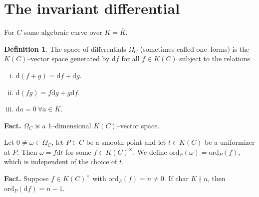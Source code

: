 \documentclass{article}
\theoremstyle{definition}
\newtheorem{defn}{Definition}[section]
\begin{document}
\section{The invariant differential}
For $C$ some algebraic curve over $K=\overline{K}$.
\begin{defn}
    The space of differentials $\Omega_C$ (sometimes called one--forms) is the $K(C)$--vector space generated by $\mathrm{d}f$ for all $f \in K(C)$ subject to the relations
    \begin{enumerate}[(i)]
        \item $\mathrm{d}(f+g)=\mathrm{d}f+\mathrm{d}g$.
        \item $\mathrm{d}(fg)=f\mathrm{d}g+g\mathrm{d}f$.
        \item $\mathrm{d}a = 0~\forall a \in K$.
    \end{enumerate}
\end{defn}
\textbf{Fact.} $\Omega_C$ is a 1--dimensional $K(C)$--vector space. 
\vspace{1mm}
 
Let $0\neq \omega \in \Omega_C$, let $P \in C$ be a smooth point and let $t \in K(C)$ be a uniformizer at $P$. Then $\omega = f \mathrm{d}t$ for some $f \in K(C)^\times$. We define $\text{ord}_P(\omega) = \text{ord}_P(f)$, which is independent of the choice of $t$.
\vspace{1mm}
 
\textbf{Fact.} Suppose $f \in K(C)^\times$ with $\text{ord}_P(f) = n \neq 0$. If $\text{char }K \nmid n$, then $\text{ord}_P(\mathrm{d}f)=n-1$. 
\vspace{1mm}
 
\end{document}
